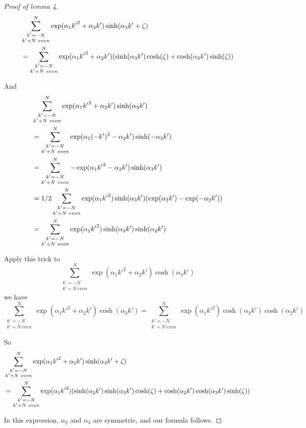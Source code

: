 \begin{proof}[Proof of lemma 4]
\begin{align}
&\sum_{ \substack {k'=-N\\ k'+N\ even}}^N \exp(\alpha_1{k'}^2+\alpha_2k')\sinh(\alpha_3k'+\zeta)\notag\\
&=\sum_{ \substack {k'=-N\\ k'+N\ even}}^N \exp(\alpha_1{k'}^2+\alpha_2k')(\sinh(\alpha_3k')\cosh(\zeta)+\cosh(\alpha_3k')\sinh(\zeta))\notag
\end{align}

And
\begin{align}
&\sum_{ \substack {k'=-N\\ k'+N\ even}}^N \exp(\alpha_1{k'}^2+\alpha_2k')\sinh(\alpha_3k')\notag\\
&=\sum_{ \substack {k'=-N\\ k'+N\ even}}^N \exp(\alpha_1(-k')^2-\alpha_2k')\sinh(-\alpha_3k')\notag\\
&=\sum_{ \substack {k'=-N\\ k'+N\ even}}^N -\exp(\alpha_1{k'}^2-\alpha_2k')\sinh(\alpha_3k')\notag\\
&=1/2\sum_{ \substack {k'=-N\\ k'+N\ even}}^N \exp(\alpha_1{k'}^2)\sinh(\alpha_3k')(\exp(\alpha_2k')-\exp(-\alpha_2k'))\notag\\
&=\sum_{ \substack {k'=-N\\ k'+N\ even}}^N \exp(\alpha_1{k'}^2)\sinh(\alpha_3k')\sinh(\alpha_2k')\notag
\end{align}

Apply this trick to
\[\sum_{ \substack {k'=-N\\ k'+N\ even}}^N \exp(\alpha_1{k'}^2+\alpha_2k')\cosh(\alpha_3k')\]
we have
\[\sum_{ \substack {k'=-N\\ k'+N\ even}}^N \exp(\alpha_1{k'}^2+\alpha_2k')\cosh(\alpha_3k')=\sum_{ \substack {k'=-N\\ k'+N\ even}}^N \exp(\alpha_1{k'}^2)\cosh(\alpha_3k')\cosh(\alpha_2k')\]

So \begin{align}
&\sum_{ \substack {k'=-N\\ k'+N\ even}}^N \exp(\alpha_1{k'}^2+\alpha_2k')\sinh(\alpha_3k'+\zeta)\notag\\
&=\sum_{ \substack {k'=-N\\ k'+N\ even}}^N \exp(\alpha_1{k'}^2)(\sinh(\alpha_2k')\sinh(\alpha_3k')\cosh(\zeta)+\cosh(\alpha_2k')\cosh(\alpha_3k')\sinh(\zeta))\notag
\end{align}

In this expression, $\alpha_2$ and $\alpha_3$ are symmetric, and our formula follows.
\end{proof} 